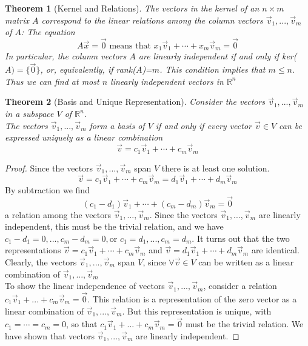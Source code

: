 \documentclass[10pt]{report}
\newtheorem{thm2}{Theorem}[section]
\begin{document}
\begin{thm2}[Kernel and Relations]
The vectors in the kernel of an $n\times m$ matrix $A$ correspond to the linear relations among the column vectors $\vec{v}_1, ...,\vec{v}_m$ of $A$: The equation
$$A\vec{x}=\vec{0} \text{ means that } x_1\vec{v}_1 + \cdots + x_m\vec{v}_m = \vec{0}$$
In particular, the column vectors $A$ are linearly independent if and only if ker($A)=\{\vec{0}\}$, or, equivalently, if rank($A$)=$m$. This condition implies that $m\leq n$. Thus we can find at most $n$ linearly independent vectors in $\mathbb{R}^n$
\end{thm2}
\begin{thm2}[Basis and Unique Representation]
Consider the vectors $\vec{v}_1, ..., \vec{v}_m$ in a subspace $V$ of $\mathbb{R}^n$.\\ The vectors $\vec{v}_1, ..., \vec{v}_m$ form a basis of $V$ if and only if every vector $\vec{v}\in V$ can be expressed uniquely as a linear combination 
$$\vec{v}=c_1\vec{v}_1 + \cdots + c_m \vec{v}_m$$
\end{thm2}
\begin{proof}
Since the vectors $\vec{v}_1, ..., \vec{v}_m$ span $V$ there is at least one solution.
$$\vec{v} = c_1\vec{v}_1 + \cdots + c_m\vec{v}_m = d_1\vec{v}_1 +\cdots + d_m\vec{v}_m$$
By subtraction we find
$$(c_1-d_1)\vec{v}_1 + \cdots + (c_m - d_m)\vec{v}_m=\vec{0}$$
a relation among the vectors $\vec{v}_1, ..., \vec{v}_m$. Since the vectors $\vec{v}_1, ..., \vec{v}_m$ are linearly independent, this must be the trivial relation, and we have $c_1-d_1=0,..., c_m - d_m = 0, $or $c_1= d_1,..., c_m = d_m$. It turns out that the two representations $\vec{v}= c_1\vec{v}_1 + \cdots + c_m\vec{v}_m$ and $\vec{v}=d_1\vec{v}_1 + \cdots + d_m\vec{v}_m$ are identical.\\
Clearly, the vectors $\vec{v}_1, ..., \vec{v}_m$ span $V$, since $\forall \vec{v}\in V$ can be written as a linear combination of $\vec{v}_1, ..., \vec{v}_m$\\
To show the linear independence of vectors $\vec{v}_1, ..., \vec{v}_m$, consider a relation $c_1\vec{v}_1 + ... + c_m\vec{v}_m = \vec{0}$. This relation is a representation of the zero vector as a linear combination of $\vec{v}_1, ..., \vec{v}_m$. But this representation is unique, with $c_1=\cdots= c_m = 0$, so that $c_1\vec{v}_1 + ... + c_m\vec{v}_m = \vec{0}$ must be the trivial relation. We have shown that vectors $\vec{v}_1, ..., \vec{v}_m$ are linearly independent.
\end{proof}
\end{document}
